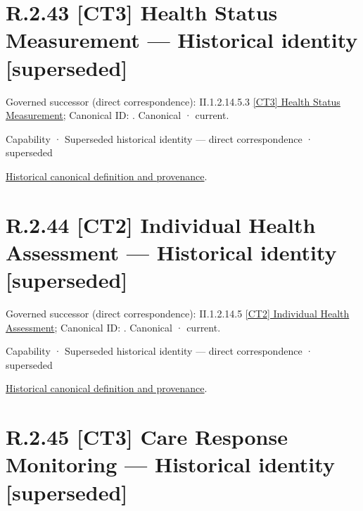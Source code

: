 \section*{R.2.43 [CT3] Health Status Measurement — Historical identity [superseded]}
\label{navigation:R.2.43}

{\small Governed successor (direct correspondence): II.1.2.14.5.3 \hyperref[element:a796bfb3335d44f6aeb9970628ed8554]{[CT3] Health Status Measurement}; Canonical ID: \texttt{}. Canonical · current.}\par
\label{element:3717906f7f8840d3a8a3e3877543dd18}
{\small Capability · Superseded historical identity — direct correspondence · superseded}\par
\href{../../../../continuum/strategy/capability/3717906f7f8840d3a8a3e3877543dd18.md}{Historical canonical definition and provenance}.\par
\section*{R.2.44 [CT2] Individual Health Assessment — Historical identity [superseded]}
\label{navigation:R.2.44}

{\small Governed successor (direct correspondence): II.1.2.14.5 \hyperref[element:045f819bb3694d3c9db7f20886e2993f]{[CT2] Individual Health Assessment}; Canonical ID: \texttt{}. Canonical · current.}\par
\label{element:9111446aa2d045bd9acd98542b0eef1f}
{\small Capability · Superseded historical identity — direct correspondence · superseded}\par
\href{../../../../continuum/strategy/capability/9111446aa2d045bd9acd98542b0eef1f.md}{Historical canonical definition and provenance}.\par
\section*{R.2.45 [CT3] Care Response Monitoring — Historical identity [superseded]}
\label{navigation:R.2.45}


